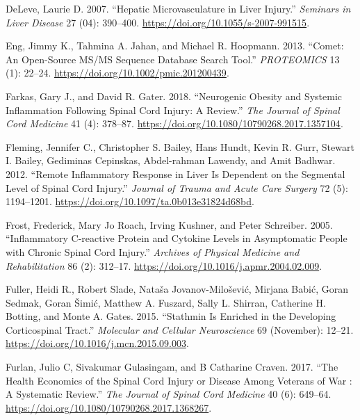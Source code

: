 \documentclass[9pt,lineno]{elife}
\newlength{\cslhangindent}
\newlength{\cslentryspacingunit} %
\newenvironment{CSLReferences}[2] %
 {%
  \setlength{\parindent}{0pt}
  \ifodd #1
  \let\oldpar\par
  \def\par{\hangindent=\cslhangindent\oldpar}
  \fi
  \setlength{\parskip}{#2\cslentryspacingunit}
 }%
 {}
\begin{document}
\begin{landscape}
\begin{landscape}
\begin{landscape}
\begin{landscape}
\begin{CSLReferences}{1}{0}
\leavevmode{}%
DeLeve, Laurie D. 2007. {``Hepatic {Microvasculature} in {Liver Injury}.''} \emph{Seminars in Liver Disease} 27 (04): 390--400. \url{https://doi.org/10.1055/s-2007-991515}.

\leavevmode{}%
Eng, Jimmy K., Tahmina A. Jahan, and Michael R. Hoopmann. 2013. {``Comet: {An} Open-Source {MS}/{MS} Sequence Database Search Tool.''} \emph{PROTEOMICS} 13 (1): 22--24. \url{https://doi.org/10.1002/pmic.201200439}.

\leavevmode{}%
Farkas, Gary J., and David R. Gater. 2018. {``Neurogenic Obesity and Systemic Inflammation Following Spinal Cord Injury: {A} Review.''} \emph{The Journal of Spinal Cord Medicine} 41 (4): 378--87. \url{https://doi.org/10.1080/10790268.2017.1357104}.

\leavevmode{}%
Fleming, Jennifer C., Christopher S. Bailey, Hans Hundt, Kevin R. Gurr, Stewart I. Bailey, Gediminas Cepinskas, Abdel-rahman Lawendy, and Amit Badhwar. 2012. {``Remote Inflammatory Response in Liver Is Dependent on the Segmental Level of Spinal Cord Injury.''} \emph{Journal of Trauma and Acute Care Surgery} 72 (5): 1194--1201. \url{https://doi.org/10.1097/ta.0b013e31824d68bd}.

\leavevmode{}%
Frost, Frederick, Mary Jo Roach, Irving Kushner, and Peter Schreiber. 2005. {``Inflammatory {C-reactive} Protein and Cytokine Levels in Asymptomatic People with Chronic Spinal Cord Injury.''} \emph{Archives of Physical Medicine and Rehabilitation} 86 (2): 312--17. \url{https://doi.org/10.1016/j.apmr.2004.02.009}.

\leavevmode{}%
Fuller, Heidi R., Robert Slade, Nataša Jovanov-Milošević, Mirjana Babić, Goran Sedmak, Goran Šimić, Matthew A. Fuszard, Sally L. Shirran, Catherine H. Botting, and Monte A. Gates. 2015. {``Stathmin Is Enriched in the Developing Corticospinal Tract.''} \emph{Molecular and Cellular Neuroscience} 69 (November): 12--21. \url{https://doi.org/10.1016/j.mcn.2015.09.003}.

\leavevmode{}%
Furlan, Julio C, Sivakumar Gulasingam, and B Catharine Craven. 2017. {``The {Health Economics} of the Spinal Cord Injury or Disease Among Veterans of War : {A} Systematic Review.''} \emph{The Journal of Spinal Cord Medicine} 40 (6): 649--64. \url{https://doi.org/10.1080/10790268.2017.1368267}.


\end{CSLReferences}
\end{landscape}
\end{landscape}
\end{landscape}
\end{landscape}
\end{document}
